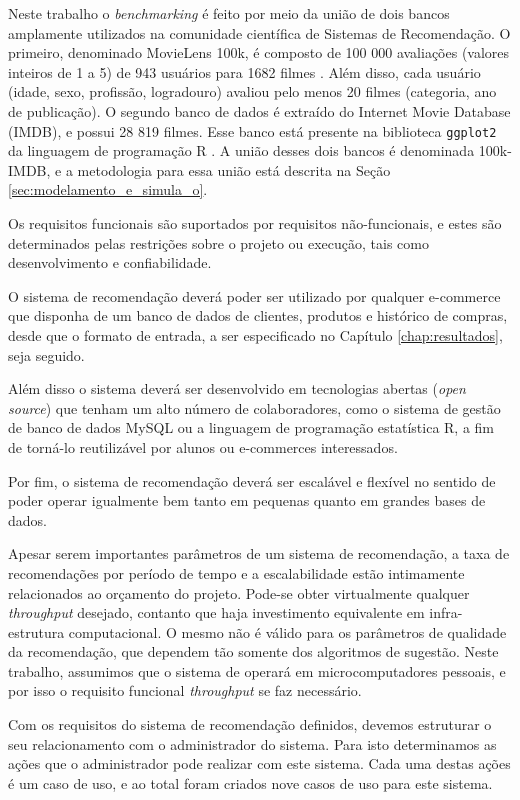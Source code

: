 Neste trabalho o \textit{benchmarking} é feito por meio da união de dois bancos amplamente utilizados na comunidade científica de Sistemas de Recomendação. O primeiro, denominado MovieLens 100k, é composto de 100 000 avaliações (valores inteiros de 1 a 5) de 943 usuários para 1682 filmes \cite{movielensdataset}. Além disso, cada usuário (idade, sexo, profissão, logradouro) avaliou pelo menos 20 filmes (categoria, ano de publicação). O segundo banco de dados é extraído do Internet Movie Database (IMDB), e possui 28 819 filmes. Esse banco está presente na biblioteca \texttt{ggplot2} da linguagem de programação R \cite{moviesggplot2dataset}. A união desses dois bancos é denominada 100k-IMDB, e a metodologia para essa união está descrita na Seção \ref{sec:modelamento_e_simula_o}.

Os requisitos funcionais são suportados por requisitos não-funcionais, e estes são determinados pelas restrições sobre o projeto ou execução, tais como desenvolvimento e confiabilidade.

O sistema de recomendação deverá poder ser utilizado por qualquer e-commerce que disponha de um banco de dados de clientes, produtos e histórico de compras, desde que o formato de entrada, a ser especificado no Capítulo \ref{chap:resultados}, seja seguido.

Além disso o sistema deverá ser desenvolvido em tecnologias abertas (\textit{open source}) que tenham um alto número de colaboradores, como o sistema de gestão de banco de dados MySQL ou a linguagem de programação estatística R, a fim de torná-lo reutilizável por alunos ou e-commerces interessados.

Por fim, o sistema de recomendação deverá ser escalável e flexível no sentido de poder operar igualmente bem tanto em pequenas quanto em grandes bases de dados.

Apesar serem importantes parâmetros de um sistema de recomendação, a taxa de recomendações por período de tempo e a escalabilidade estão intimamente relacionados ao orçamento do projeto. Pode-se obter virtualmente qualquer \textit{throughput} desejado, contanto que haja investimento equivalente em infra-estrutura computacional. O mesmo não é válido para os parâmetros de qualidade da recomendação, que dependem tão somente dos algoritmos de sugestão. Neste trabalho, assumimos que o sistema de operará em microcomputadores pessoais, e por isso o requisito funcional \textit{throughput} se faz necessário.

Com os requisitos do sistema de recomendação definidos, devemos estruturar o seu relacionamento com o administrador do sistema. Para isto determinamos as ações que o administrador pode realizar com este sistema. Cada uma destas ações é um caso de uso, e ao total foram criados nove casos de uso para este sistema.

